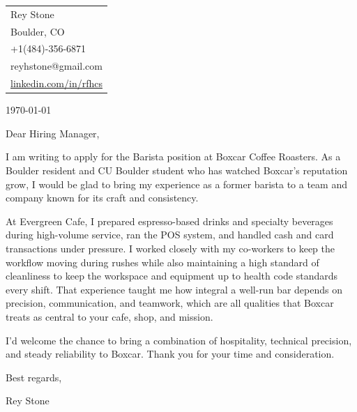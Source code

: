 \documentclass[11pt]{article}
\begin{document}
\hfill
\begin{tabular}{l @{}}
\hfill {Rey Stone} \\
\hfill {Boulder, CO} \\
\hfill {+1(484)-356-6871} \\
\hfill {reyhstone@gmail.com} \\
\hfill {\href{https://linkedin.com/in/reyhstone}{linkedin.com/in/rfhcs}} \\
\end{tabular}

\today

\bigskip %

Dear Hiring Manager,

\bigskip %


I am writing to apply for the Barista position at Boxcar Coffee Roasters. As a Boulder resident and CU Boulder student who has watched Boxcar's reputation grow, I would be glad to bring my experience as a former barista to a team and company known for its craft and consistency.

At Evergreen Cafe, I prepared espresso-based drinks and specialty beverages during high-volume service, ran the POS system, and handled cash and card transactions under pressure. I worked closely with my co-workers to keep the workflow moving during rushes while also maintaining a high standard of cleanliness to keep the workspace and equipment up to health code standards every shift. That experience taught me how integral a well-run bar depends on precision, communication, and teamwork, which are all qualities that Boxcar treats as central to your cafe, shop, and mission.

I'd welcome the chance to bring a combination of hospitality, technical precision, and steady reliability to Boxcar. Thank you for your time and consideration.


\bigskip

Best regards,

Rey Stone
\end{document}
